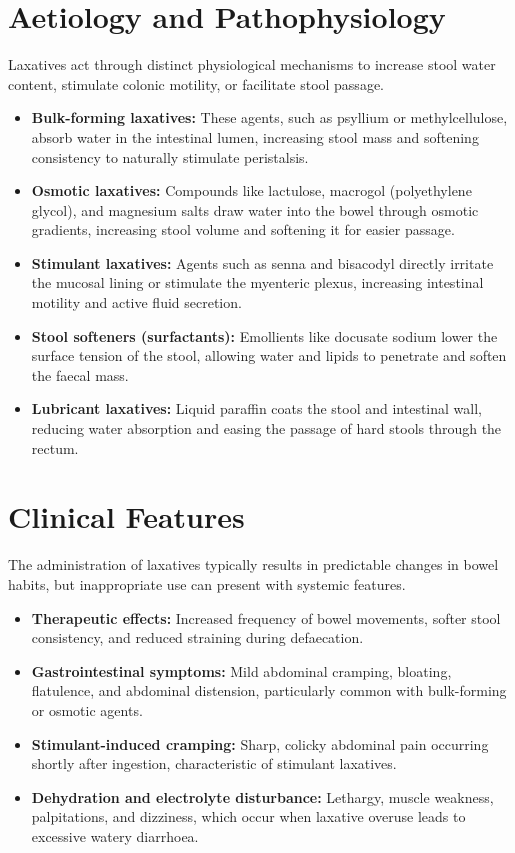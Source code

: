 \section*{Aetiology and Pathophysiology}
Laxatives act through distinct physiological mechanisms to increase stool water content, stimulate colonic motility, or facilitate stool passage.
\begin{itemize}
    \item \textbf{Bulk-forming laxatives:} These agents, such as psyllium or methylcellulose, absorb water in the intestinal lumen, increasing stool mass and softening consistency to naturally stimulate peristalsis.
    \item \textbf{Osmotic laxatives:} Compounds like lactulose, macrogol (polyethylene glycol), and magnesium salts draw water into the bowel through osmotic gradients, increasing stool volume and softening it for easier passage.
    \item \textbf{Stimulant laxatives:} Agents such as senna and bisacodyl directly irritate the mucosal lining or stimulate the myenteric plexus, increasing intestinal motility and active fluid secretion.
    \item \textbf{Stool softeners (surfactants):} Emollients like docusate sodium lower the surface tension of the stool, allowing water and lipids to penetrate and soften the faecal mass.
    \item \textbf{Lubricant laxatives:} Liquid paraffin coats the stool and intestinal wall, reducing water absorption and easing the passage of hard stools through the rectum.
\end{itemize}

\section*{Clinical Features}
The administration of laxatives typically results in predictable changes in bowel habits, but inappropriate use can present with systemic features.
\begin{itemize}
    \item \textbf{Therapeutic effects:} Increased frequency of bowel movements, softer stool consistency, and reduced straining during defaecation.
    \item \textbf{Gastrointestinal symptoms:} Mild abdominal cramping, bloating, flatulence, and abdominal distension, particularly common with bulk-forming or osmotic agents.
    \item \textbf{Stimulant-induced cramping:} Sharp, colicky abdominal pain occurring shortly after ingestion, characteristic of stimulant laxatives.
    \item \textbf{Dehydration and electrolyte disturbance:} Lethargy, muscle weakness, palpitations, and dizziness, which occur when laxative overuse leads to excessive watery diarrhoea.
\end{itemize}


